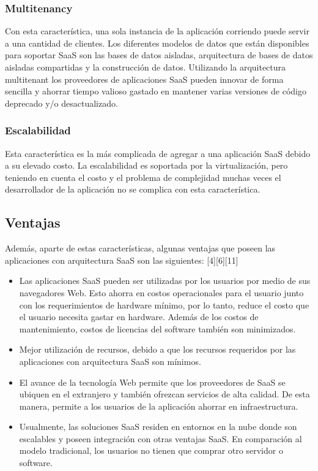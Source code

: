 \subsubsection{Multitenancy}
Con esta característica, una sola instancia de la aplicación corriendo puede servir a una cantidad de clientes. Los diferentes modelos de datos que están disponibles para soportar SaaS son las bases de datos aisladas, arquitectura de bases de datos aisladas compartidas y la construcción de datos. Utilizando la arquitectura multitenant los proveedores de aplicaciones SaaS pueden innovar de forma sencilla y ahorrar tiempo valioso gastado en mantener varias versiones de código deprecado y/o desactualizado.

\subsubsection{Escalabilidad}
Esta característica es la más complicada de agregar a una aplicación SaaS debido a su elevado costo. La escalabilidad es soportada por la virtualización, pero teniendo en cuenta el costo y el problema de complejidad muchas veces el desarrollador de la aplicación no se complica con esta característica.

\subsection{Ventajas}
Además, aparte de estas características, algunas ventajas que poseen las aplicaciones con arquitectura SaaS son las siguientes: [4][6][11]
\begin{itemize}
	\item Las aplicaciones SaaS pueden ser utilizadas por los usuarios por medio de sus navegadores Web. Esto ahorra en costos operacionales para el usuario junto con los requerimientos de hardware mínimo, por lo tanto, reduce el costo que el usuario necesita gastar en hardware.  Además de los costos de mantenimiento, costos de licencias del software también son minimizados.
	\item Mejor utilización de recursos, debido a que los recursos requeridos por las aplicaciones con arquitectura SaaS son mínimos.
	\item El avance de la tecnología Web permite que los proveedores de SaaS se ubiquen en el extranjero y también ofrezcan servicios de alta calidad. De esta manera, permite a los usuarios de la aplicación ahorrar en infraestructura.
	\item Usualmente, las soluciones SaaS residen en entornos en la nube donde son escalables y poseen integración con otras ventajas SaaS. En comparación al modelo tradicional, los usuarios no tienen que comprar otro servidor o software.
\end{itemize}
